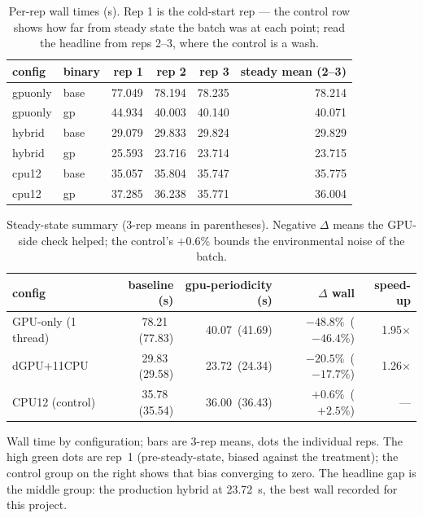 \documentclass[
	english,
	letterpaper, oneside
]{article}
\begin{document}
\begin{table}[H]
\centering
\caption{Per-rep wall times (s). Rep 1 is the cold-start rep --- the control
row shows how far from steady state the batch was at each point; read the
headline from reps 2--3, where the control is a wash.}
\label{tab:walls}
\small
\begin{tabular}{llrrrr}
\toprule
config & binary & rep 1 & rep 2 & rep 3 & steady mean (2--3) \\
\midrule
gpuonly & base & 77.049 & 78.194 & 78.235 & 78.214 \\
gpuonly & gp   & 44.934 & 40.003 & 40.140 & 40.071 \\
\midrule
hybrid  & base & 29.079 & 29.833 & 29.824 & 29.829 \\
hybrid  & gp   & 25.593 & 23.716 & 23.714 & 23.715 \\
\midrule
cpu12   & base & 35.057 & 35.804 & 35.747 & 35.775 \\
cpu12   & gp   & 37.285 & 36.238 & 35.771 & 36.004 \\
\bottomrule
\end{tabular}
\end{table}

\begin{table}[H]
\centering
\caption{Steady-state summary (3-rep means in parentheses). Negative
$\Delta$ means the GPU-side check helped; the control's $+0.6\%$
bounds the environmental noise of the batch.}
\label{tab:summary}
\footnotesize
\setlength{\tabcolsep}{4pt}
\begin{tabular}{lrrrr}
\toprule
config & baseline (s) & gpu-periodicity (s) & $\Delta$ wall & speed-up \\
\midrule
GPU-only (1 thread) & 78.21 \,(77.83) & 40.07 \,(41.69) & $-48.8\%$ \,($-46.4\%$) & 1.95$\times$ \\
dGPU+11CPU          & 29.83 \,(29.58) & 23.72 \,(24.34) & $-20.5\%$ \,($-17.7\%$) & 1.26$\times$ \\
CPU12 (control)     & 35.78 \,(35.54) & 36.00 \,(36.43) & $+0.6\%$ \,($+2.5\%$) & --- \\
\bottomrule
\end{tabular}
\end{table}

            {Wall time by configuration; bars are 3-rep means, dots the
             individual reps. The high green dots are rep~1 (pre-steady-state,
             biased against the treatment); the control group on the
             right shows that bias converging to zero. The headline gap is
             the middle group: the production hybrid at 23.72~s, the best
             wall recorded for this project. \label{fig:wall}}
\end{document}
